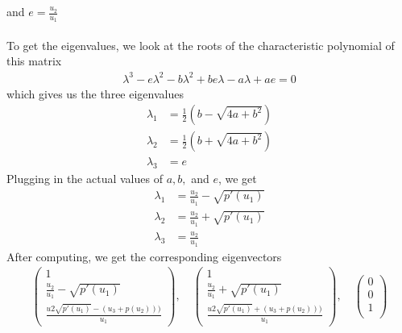  and $e=\frac{u_2}{u_1}$
\\ \\
To get the eigenvalues, we look at the roots of the characteristic polynomial of this matrix 
\begin{align*}
	\lambda^3 -e \lambda^2 - b \lambda^2 + b e \lambda -a \lambda + a e = 0
\end{align*}
which gives us the three eigenvalues 
\begin{align*}
	\lambda_1 &= \frac{1}{2} (b - \sqrt{4a+b^2}) \\
	\lambda_2 &= \frac{1}{2} (b + \sqrt{4a+b^2}) \\
	\lambda_3 &= e
\end{align*}
Plugging in the actual values of $a,b,$ and $e$, we get 
\begin{align*}
	\lambda_1 &= \frac{u_2}{u_1} - \sqrt{p'(u_1)} \\
	\lambda_2 &= \frac{u_2}{u_1} + \sqrt{p'(u_1)} \\
	\lambda_3 &= \frac{u_2}{u_1}
\end{align*}
After computing, we get the corresponding eigenvectors 
\begin{align*}
\begin{pmatrix}
1 \\
 \frac{u_2}{u_1} - \sqrt{p'(u_1 )} \\
 \frac{u2 \sqrt{p'(u_1)}-(u_3+p(u_2)))}{u_1} 
\end{pmatrix}, \quad \begin{pmatrix}
1 \\
 \frac{u_2}{u_1} + \sqrt{p'(u_1 )} \\
 \frac{u2 \sqrt{p'(u_1)}+(u_3+p(u_2)))}{u_1} 
\end{pmatrix}, \quad \begin{pmatrix}
 0 \\
 0  \\
 1 \\
\end{pmatrix}
\end{align*}
